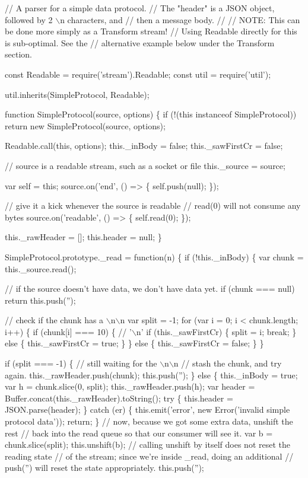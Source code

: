 \begin{DoxyCode}
// A parser for a simple data protocol.
// The "header" is a JSON object, followed by 2 \(\backslash\)n characters, and
// then a message body.
//
// NOTE: This can be done more simply as a Transform stream!
// Using Readable directly for this is sub-optimal. See the
// alternative example below under the Transform section.

const Readable = require('stream').Readable;
const util = require('util');

util.inherits(SimpleProtocol, Readable);

function SimpleProtocol(source, options) \{
  if (!(this instanceof SimpleProtocol))
    return new SimpleProtocol(source, options);

  Readable.call(this, options);
  this.\_inBody = false;
  this.\_sawFirstCr = false;

  // source is a readable stream, such as a socket or file
  this.\_source = source;

  var self = this;
  source.on('end', () => \{
    self.push(null);
  \});

  // give it a kick whenever the source is readable
  // read(0) will not consume any bytes
  source.on('readable', () => \{
    self.read(0);
  \});

  this.\_rawHeader = [];
  this.header = null;
\}

SimpleProtocol.prototype.\_read = function(n) \{
  if (!this.\_inBody) \{
    var chunk = this.\_source.read();

    // if the source doesn't have data, we don't have data yet.
    if (chunk === null)
      return this.push('');

    // check if the chunk has a \(\backslash\)n\(\backslash\)n
    var split = -1;
    for (var i = 0; i < chunk.length; i++) \{
      if (chunk[i] === 10) \{ // '\(\backslash\)n'
        if (this.\_sawFirstCr) \{
          split = i;
          break;
        \} else \{
          this.\_sawFirstCr = true;
        \}
      \} else \{
        this.\_sawFirstCr = false;
      \}
    \}

    if (split === -1) \{
      // still waiting for the \(\backslash\)n\(\backslash\)n
      // stash the chunk, and try again.
      this.\_rawHeader.push(chunk);
      this.push('');
    \} else \{
      this.\_inBody = true;
      var h = chunk.slice(0, split);
      this.\_rawHeader.push(h);
      var header = Buffer.concat(this.\_rawHeader).toString();
      try \{
        this.header = JSON.parse(header);
      \} catch (er) \{
        this.emit('error', new Error('invalid simple protocol data'));
        return;
      \}
      // now, because we got some extra data, unshift the rest
      // back into the read queue so that our consumer will see it.
      var b = chunk.slice(split);
      this.unshift(b);
      // calling unshift by itself does not reset the reading state
      // of the stream; since we're inside \_read, doing an additional
      // push('') will reset the state appropriately.
      this.push('');


\end{DoxyCode}
